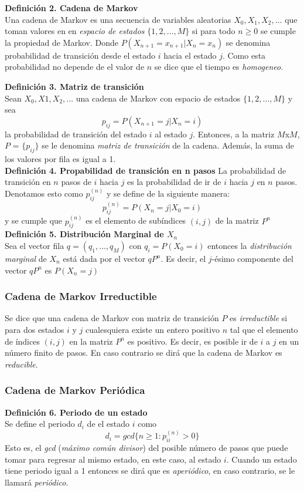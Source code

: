 \documentclass[10pt,a4paper]{article}
\theoremstyle{definition}
\theoremstyle{remark}
\begin{document}
\begin{multicols}{2}
\textbf{Definición 2. Cadena de Markov}\\
Una cadena de Markov es una secuencia de variables aleatorias $X_{0},X_{1},X_{2},...$ 
que toman valores en en \textit{espacio de estados} $\{1,2,\dots,M\}$ si para todo $n
\geq0$ se cumple la propiedad de Markov. Donde $P(X_{n+1}=x_{n+1}|X_{n}=x_n)$ se 
denomina probabilidad de transición desde el estado $i$ hacia el estado $j$. Como esta 
probabilidad no depende de el valor de $n$ se dice que el tiempo es \textit{homogeneo}.\
\

\textbf{Definición 3. Matriz de transición}\\
Sean $X_{0},X{1},X_{2},\dots$ una cadena de Markov con espacio de estados $\{1,2,\dots,M\}$ y sea
\[
p_{ij} = P(X_{n+1}=j|X_{n}=i)
\] 
la probabilidad de transición del estado $i$ al estado $j$. Entonces, a la matriz $M$x$M$, $P$ = $\{p_{ij}\}$ se le denomina \textit{matriz de transición} de la cadena. Además, la suma de los valores por fila es igual a 1.\\

\textbf{Definición 4. Propabilidad de transición en n pasos}
La probabilidad de transición en $n$ pasos de $i$ hacia $j$ es la probabilidad de ir de $i$ hacia $j$ en $n$ pasos. Denotamos esto como $p_{ij}^{(n)}$ y se define de la siguiente manera:
\[
p_{ij}^{(n)} = P(X_{n}=j|X_{0}=i)
\]
y se cumple que $p_{ij}^{(n)}$ es el elemento de subíndices $(i,j)$ de la matriz $P^{n}$\\

\textbf{Definición 5. Distribución Marginal de $X_{n}$}\\
Sea el vector fila $q = (q_{1},\dots,q_{M})$ con $q_{i} = P(X_{0} = i)$ entonces la \textit{distribución marginal} de $X_{n}$ está dada por el vector $qP^{n}$. Es decir, el $j$-ésimo componente del vector $qP^{n}$ es $P(X_{n} = j)$
\subsubsection{Cadena de Markov Irreductible}
Se dice que una cadena de Markov con matriz de transición $P$ es \textit{irreductible} si para dos estados $i$ y $j$ cualesquiera existe un entero positivo $n$ tal que el elemento de índices $(i,j)$ en la matriz $P^n$ es positivo. Es decir, es posible ir de $i$ a $j$ en un número finito de pasos. En caso contrario se dirá que la cadena de Markov es \textit{reducible}.

\subsubsection{Cadena de Markov Periódica}
\textbf{Definición 6. Periodo de un estado}\\
Se define el periodo $d_{i}$ de el estado $i$ como
\[
d_{i} = gcd\{n\geq1:p_{ii}^{(n)}>0\}
\]
Esto es, el \textit{gcd} (\textit{máximo común divisor}) del posible número de pasos que puede tomar para regresar al mismo estado, en este caso, al estado $i$. 
Cuando un estado tiene periodo igual a 1 entonces se dirá que es \textit{aperiódico}, en caso contrario, se le llamará \textit{periódico}.\\


\end{multicols}
\end{document}
